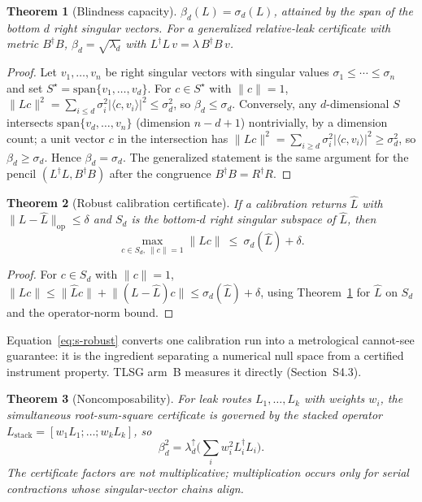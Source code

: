 \documentclass[10pt,onecolumn]{article}
\theoremstyle{plain}
\newtheorem{theorem}{Theorem}
\theoremstyle{definition}
\newcommand{\bd}{\beta}
\begin{document}
\begin{theorem}[Blindness capacity]\label{thm:s-capacity}
$\bd_d(L)=\sigma_d(L)$, attained by the span of the bottom $d$ right singular
vectors. For a generalized relative-leak certificate with metric $B^\dagger B$,
$\bd_d=\sqrt{\lambda_d}$ with $L^\dagger L\,v=\lambda\,B^\dagger B\,v$.
\end{theorem}

\begin{proof}
Let $v_1,\dots,v_n$ be right singular vectors with singular values $\sigma_1\le
\cdots\le\sigma_n$ and set $S^\star=\mathrm{span}\{v_1,\dots,v_d\}$. For $c\in
S^\star$ with $\lVert c\rVert=1$, $\lVert Lc\rVert^2=\sum_{i\le d}\sigma_i^2|\langle
c,v_i\rangle|^2\le\sigma_d^2$, so $\bd_d\le\sigma_d$. Conversely, any $d$-dimensional
$S$ intersects $\mathrm{span}\{v_d,\dots,v_n\}$ (dimension $n-d+1$) nontrivially, by a
dimension count; a unit vector $c$ in the intersection has $\lVert Lc\rVert^2=\sum_{i
\ge d}\sigma_i^2|\langle c,v_i\rangle|^2\ge\sigma_d^2$, so $\bd_d\ge\sigma_d$. Hence
$\bd_d=\sigma_d$. The generalized statement is the same argument for the pencil
$(L^\dagger L,B^\dagger B)$ after the congruence $B^\dagger B=R^\dagger R$.
\end{proof}

\begin{theorem}[Robust calibration certificate]\label{thm:s-robust}
If a calibration returns $\hat L$ with $\lVert L-\hat L\rVert_{\mathrm{op}}\le\delta$
and $S_d$ is the bottom-$d$ right singular subspace of $\hat L$, then
\begin{equation}
\max_{c\in S_d,\ \lVert c\rVert=1}\lVert Lc\rVert\ \le\ \sigma_d(\hat L)+\delta.
\label{eq:s-robust}
\end{equation}
\end{theorem}

\begin{proof}
For $c\in S_d$ with $\lVert c\rVert=1$, $\lVert Lc\rVert\le\lVert\hat Lc\rVert+
\lVert(L-\hat L)c\rVert\le\sigma_d(\hat L)+\delta$, using
Theorem~\ref{thm:s-capacity} for $\hat L$ on $S_d$ and the operator-norm bound.
\end{proof}

Equation~\eqref{eq:s-robust} converts one calibration run into a metrological
cannot-see guarantee: it is the ingredient separating a numerical null space from a
certified instrument property. TLSG arm~B measures it directly (Section~S4.3).

\begin{theorem}[Noncomposability]\label{thm:s-noncompose}
For leak routes $L_1,\dots,L_k$ with weights $w_i$, the simultaneous root-sum-square
certificate is governed by the stacked operator
$L_{\mathrm{stack}}=[w_1L_1;\dots;w_kL_k]$, so
\begin{equation}
\bd_d^2=\lambda_d^{\uparrow}\!\Big(\textstyle\sum_i w_i^2 L_i^\dagger L_i\Big).
\label{eq:s-noncompose}
\end{equation}
The certificate factors are not multiplicative; multiplication occurs only for
serial contractions whose singular-vector chains align.
\end{theorem}
\end{document}

